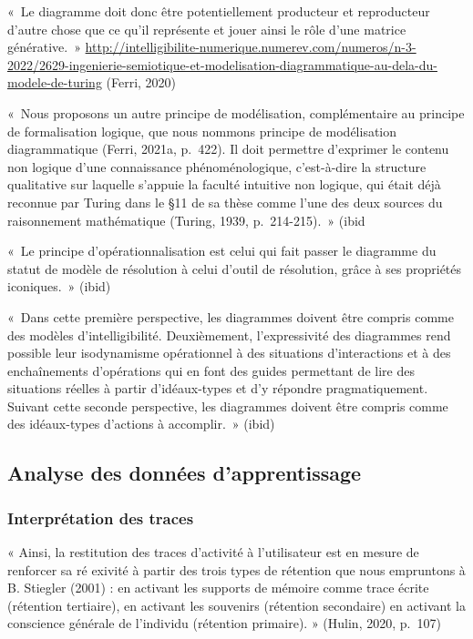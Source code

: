 \documentclass[
  a4paper,
  DIV=11,
  numbers=noendperiod]{scrreprt}
\begin{document}
«~Le diagramme doit donc être potentiellement producteur et reproducteur
d'autre chose que ce qu'il représente et jouer ainsi le rôle d'une
matrice générative.~»
\url{http://intelligibilite-numerique.numerev.com/numeros/n-3-2022/2629-ingenierie-semiotique-et-modelisation-diagrammatique-au-dela-du-modele-de-turing}
(Ferri, 2020)

«~Nous proposons un autre principe de modélisation, complémentaire au
principe de formalisation logique, que nous nommons principe de
modélisation diagrammatique (Ferri, 2021a, p.~422). Il doit permettre
d'exprimer le contenu non logique d'une connaissance phénoménologique,
c'est-à-dire la structure qualitative sur laquelle s'appuie la faculté
intuitive non logique, qui était déjà reconnue par Turing dans le §11 de
sa thèse comme l'une des deux sources du raisonnement mathématique
(Turing, 1939, p.~214-215).~» (ibid

«~Le principe d'opérationnalisation est celui qui fait passer le
diagramme du statut de modèle de résolution à celui d'outil de
résolution, grâce à ses propriétés iconiques.~» (ibid)

«~Dans cette première perspective, les diagrammes doivent être compris
comme des modèles d'intelligibilité. Deuxièmement, l'expressivité des
diagrammes rend possible leur isodynamisme opérationnel à des situations
d'interactions et à des enchaînements d'opérations qui en font des
guides permettant de lire des situations réelles à partir d'idéaux-types
et d'y répondre pragmatiquement. Suivant cette seconde perspective, les
diagrammes doivent être compris comme des idéaux-types d'actions à
accomplir.~» (ibid)

\subsection{Analyse des données
d'apprentissage}\label{analyse-des-donnuxe9es-dapprentissage}

\subsubsection{Interprétation des
traces}\label{interpruxe9tation-des-traces}

« Ainsi, la restitution des traces d'activité à l'utilisateur est en
mesure de renforcer sa ré exivité à partir des trois types de rétention
que nous empruntons à B. Stiegler (2001) : en activant les supports de
mémoire comme trace écrite (rétention tertiaire), en activant les
souvenirs (rétention secondaire) en activant la conscience générale de
l'individu (rétention primaire). » (Hulin, 2020, p.~107)
\end{document}
